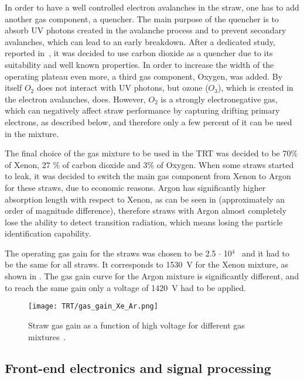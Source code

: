 In order to have a well controlled electron avalanches in the straw, one has to add another gas component, a quencher. The main purpose of the quencher is to absorb UV photons created in the avalanche process and to prevent secondary avalanches, which can lead to an early breakdown.
After a dedicated study, reported in~\cite{Abat:2008zza}, it was decided to use carbon dioxide as a quencher due to its suitability and well known properties.
In order to increase the width of the operating plateau even more, a third gas component, Oxygen, was added.
By itself $O_2$ does not interact with UV photons, but ozone ($O_3$), which is created in the electron avalanches, does.
However, $O_2$ is a strongly electronegative gas, which can negatively affect straw performance by capturing drifting primary electrons, as described below,
and therefore only a few percent of it can be used in the mixture.
 
The final choice of the gas mixture to be used in the TRT was decided to be 70$\%$ of Xenon, 27 $\%$ of carbon dioxide and 3$\%$ of Oxygen.
When some straws started to leak, it was decided to switch the main gas component from Xenon to Argon for these straws, due to economic reasons.
Argon has significantly higher absorption length with respect to Xenon, as can be seen in  (approximately an order of magnitude difference), 
therefore straws with Argon almost completely lose the ability to detect transition radiation, 
which means losing the particle identification capability.

The operating gas gain for the straws was chosen to be 2.5 $\cdot$ 10$^4$~\cite{ID_TDR_vol1} and it had to be the same for all straws. It corresponds to 1530~V for the Xenon mixture, as shown in .
The gas gain curve for the Argon mixture is significantly different, and to reach the same gain only a voltage of 1420~V had to be applied.

\begin{figure}[h]
\centering
\texttt{[image: TRT/gas\_gain\_Xe\_Ar.png]}
\caption{ 
Straw gas gain as a function of high voltage for different gas mixtures~\cite{Abat:2008zza}.
}
\label{fig:gas_gain}
\end{figure}



\subsection{Front-end electronics and signal processing}
\label{subsubsec:front_end_electronics}

